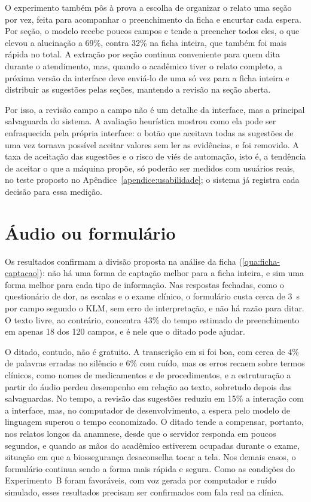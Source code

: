 O experimento também pôs à prova a escolha de organizar o relato uma seção por vez, feita para acompanhar o preenchimento da ficha e encurtar cada espera. Por seção, o modelo recebe poucos campos e tende a preencher todos eles, o que elevou a alucinação a 69\%, contra 32\% na ficha inteira, que também foi mais rápida no total. A extração por seção continua conveniente para quem dita durante o atendimento, mas, quando o acadêmico tiver o relato completo, a próxima versão da interface deve enviá-lo de uma só vez para a ficha inteira e distribuir as sugestões pelas seções, mantendo a revisão na seção aberta.

Por isso, a revisão campo a campo não é um detalhe da interface, mas a principal salvaguarda do sistema. A avaliação heurística mostrou como ela pode ser enfraquecida pela própria interface: o botão que aceitava todas as sugestões de uma vez tornava possível aceitar valores sem ler as evidências, e foi removido. A taxa de aceitação das sugestões e o risco de viés de automação, isto é, a tendência de aceitar o que a máquina propõe, só poderão ser medidos com usuários reais, no teste proposto no Apêndice~\ref{apendice:usabilidade}; o sistema já registra cada decisão para essa medição.

\section{Áudio ou formulário}

Os resultados confirmam a divisão proposta na análise da ficha (\autoref{qua:ficha-captacao}): não há uma forma de captação melhor para a ficha inteira, e sim uma forma melhor para cada tipo de informação. Nas respostas fechadas, como o questionário de dor, as escalas e o exame clínico, o formulário custa cerca de 3~s por campo segundo o KLM, sem erro de interpretação, e não há razão para ditar. O texto livre, ao contrário, concentra 43\% do tempo estimado de preenchimento em apenas 18 dos 120 campos, e é nele que o ditado pode ajudar.

O ditado, contudo, não é gratuito. A transcrição em si foi boa, com cerca de 4\% de palavras erradas no silêncio e 6\% com ruído, mas os erros recaem sobre termos clínicos, como nomes de medicamentos e de procedimentos, e a estruturação a partir do áudio perdeu desempenho em relação ao texto, sobretudo depois das salvaguardas. No tempo, a revisão das sugestões reduziu em 15\% a interação com a interface, mas, no computador de desenvolvimento, a espera pelo modelo de linguagem superou o tempo economizado. O ditado tende a compensar, portanto, nos relatos longos da anamnese, desde que o servidor responda em poucos segundos, e quando as mãos do acadêmico estiverem ocupadas durante o exame, situação em que a biossegurança desaconselha tocar a tela. Nos demais casos, o formulário continua sendo a forma mais rápida e segura. Como as condições do Experimento~B foram favoráveis, com voz gerada por computador e ruído simulado, esses resultados precisam ser confirmados com fala real na clínica.

